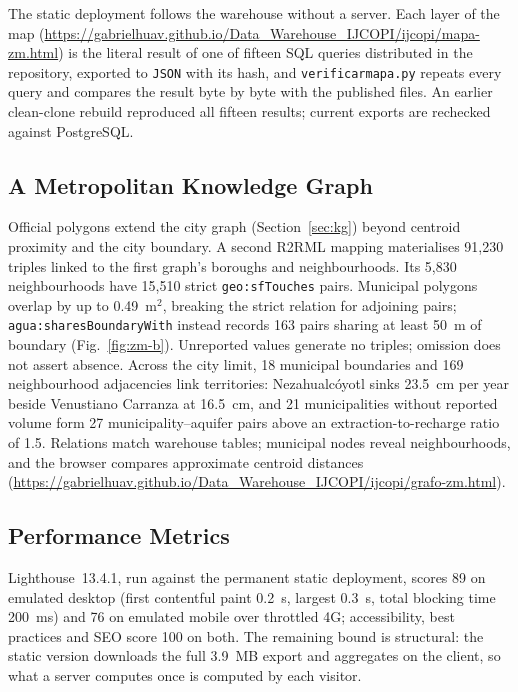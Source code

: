 \documentclass[runningheads]{llncs}
\newif\ifmarcarcambios
\newcommand{\icokg}[1]{\ifmarcarcambios\textcolor{nuevo}{#1}\else#1\fi}
\newenvironment{nuevobloque}{}{}
\renewcommand{\_}{\origunderscore\allowbreak}
\begin{document}
\begin{nuevobloque}
The static deployment follows the warehouse without a server. Each layer of the map
(\url{https://gabrielhuav.github.io/Data_Warehouse_IJCOPI/ijcopi/mapa-zm.html}) is the literal
result of one of fifteen SQL queries distributed in the repository, exported to \texttt{JSON} with
its hash, and \texttt{verificar\_mapa.py} repeats every query and compares the result byte by byte
with the published files. An earlier clean-clone rebuild reproduced all fifteen results;
current exports are rechecked against PostgreSQL.

\subsection{A Metropolitan Knowledge Graph}
\label{sec:kgmetro}

Official polygons extend the city graph (Section~\ref{sec:kg}) beyond centroid proximity
and the city boundary. A second R2RML mapping materialises 91,230 triples linked to the
first graph's boroughs and neighbourhoods. Its 5,830 neighbourhoods have 15,510 strict
\texttt{geo:sfTouches} pairs. Municipal polygons overlap by up to 0.49~m$^2$, breaking
the strict relation for adjoining pairs; \texttt{agua:sharesBoundaryWith} instead records
163 pairs sharing at least 50~m of boundary (Fig.~\ref{fig:zm-b}). Unreported values
generate no triples; omission does not assert absence. Across the city limit, 18 municipal
boundaries and 169 neighbourhood adjacencies link territories: Nezahualc\'oyotl sinks
23.5~cm per year beside Venustiano Carranza at 16.5~cm, and 21 municipalities without
reported volume form 27 municipality--aquifer pairs above an extraction-to-recharge
ratio of 1.5. Relations match warehouse tables; municipal nodes reveal neighbourhoods,
and the browser compares approximate centroid distances
(\url{https://gabrielhuav.github.io/Data_Warehouse_IJCOPI/ijcopi/grafo-zm.html}).
\end{nuevobloque}

\subsection{Performance Metrics}

\icokg{Lighthouse~13.4.1, run against the permanent static deployment, scores 89
on emulated desktop (first contentful paint 0.2~s, largest 0.3~s, total blocking
time 200~ms) and 76 on emulated mobile over throttled 4G; accessibility, best
practices and SEO score 100 on both. The remaining bound is structural: the
static version downloads the full 3.9~MB export and aggregates on the client, so
what a server computes once is computed by each visitor.}
\end{document}
